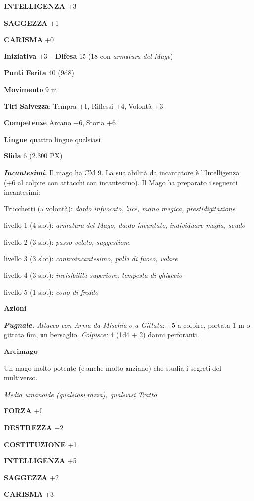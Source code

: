 \begin{multicols}{2}
\textbf{INTELLIGENZA} +3

\textbf{SAGGEZZA} +1

\textbf{CARISMA} +0

\textbf{Iniziativa} +3 -- \textbf{Difesa} 15 (18 con \textit{armatura del Mago})

\textbf{Punti Ferita} 40 (9d8)

\textbf{Movimento} 9 m

\textbf{Tiri Salvezza}: Tempra +1, Riflessi +4, Volontà +3

\textbf{Competenze} Arcano +6, Storia +6

\textbf{Lingue} quattro lingue qualsiasi

\textbf{Sfida} 6 (2.300 PX)

\textit{\textbf{Incantesimi.}} Il mago ha CM 9. La sua abilità da incantatore è l'Intelligenza (+6 al colpire con attacchi con incantesimo). Il Mago ha preparato i seguenti incantesimi:

Trucchetti (a volontà): \textit{dardo infuocato, luce, mano magica,}
\textit{prestidigitazione}

livello 1 (4 slot): \textit{armatura del Mago, dardo incantato,}
\textit{individuare magia, scudo}

livello 2 (3 slot): \textit{passo velato, suggestione}

livello 3 (3 slot): \textit{controincantesimo, palla di fuoco, volare}

livello 4 (3 slot): \textit{invisibilità superiore, tempesta di ghiaccio}

livello 5 (1 slot): \textit{cono di freddo}

\textbf{Azioni}

\textit{\textbf{Pugnale.} Attacco con Arma da Mischia o a Gittata}: +5 a colpire, portata 1 m o gittata 6m, un bersaglio. \textit{Colpisce:} 4 (1d4 + 2) danni perforanti.

\medskip\textbf{Arcimago}

Un mago molto potente (e anche molto anziano) che studia i segreti del multiverso.

\textit{Media umanoide (qualsiasi razza), qualsiasi Tratto}

\textbf{FORZA} +0

\textbf{DESTREZZA} +2

\textbf{COSTITUZIONE} +1

\textbf{INTELLIGENZA} +5

\textbf{SAGGEZZA} +2

\textbf{CARISMA} +3


\end{multicols}
